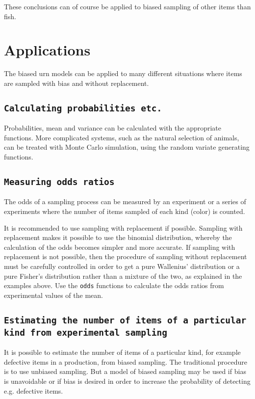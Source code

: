 \documentclass[a4paper]{article}
\begin{document}
These conclusions can of course be applied to biased sampling of
other items than fish.


\section{Applications}
%
The biased urn models can be applied to many different situations
where items are sampled with bias and without replacement.

\subsection{\tt Calculating probabilities etc.}
Probabilities, mean and variance can be calculated with the appropriate
functions. More complicated systems, such as the natural selection
of animals, can be treated with Monte Carlo simulation, using the
random variate generating functions.

\subsection{\tt Measuring odds ratios}
The odds of a sampling process can be measured by an experiment or
a series of experiments where the number of items sampled of
each kind (color) is counted.

It is recommended to use sampling with replacement if possible.  
Sampling with replacement makes it possible to use the binomial
distribution, whereby the calculation of the odds becomes simpler
and more accurate. If sampling with replacement is not possible,
then the procedure of sampling without replacement must be 
carefully controlled in order to get a pure Wallenius' distribution 
or a pure Fisher's distribution rather than a mixture of the two, 
as explained in the examples above.
Use the {\tt odds} functions to calculate the odds ratios from
experimental values of the mean.

\subsection{\tt Estimating the number of items of a particular kind
from experimental sampling}
It is possible to estimate the number of items of a particular kind,
for example defective items in a production, from biased sampling.
The traditional procedure is to use unbiased sampling. 
But a model of biased sampling may be used if bias is unavoidable 
or if bias is desired in order to increase the probability of 
detecting e.g. defective items.
\end{document}
